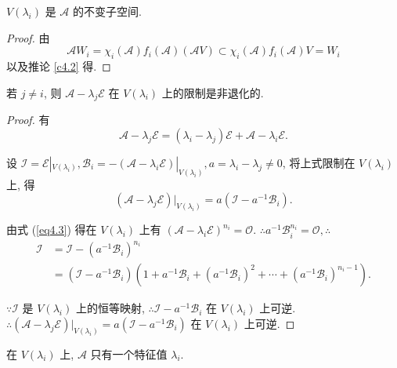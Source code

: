 \documentclass[color=black,device=normal,lang=cn,mode=geye]{elegantnote}
\begin{document}
\begin{corollary}
    $V(\lambda_i)$ 是 $\mathcal{A}$ 的不变子空间.
\end{corollary}
\begin{proof}
    由
    \[\mathcal{A}W_i=\chi_i(\mathcal{A})f_i(\mathcal{A})(\mathcal{A}V)\subset\chi_i(\mathcal{A})f_i(\mathcal{A})V=W_i\]
    以及推论 \ref{c4.2} 得.
\end{proof}
\begin{corollary}\label{c4.4}
    若 $j\neq i$, 则 $\mathcal{A}-\lambda_j\mathcal{E}$ 在 $V(\lambda_i)$ 上的限制是非退化的.
\end{corollary}
\begin{proof}
    有
    \[\mathcal{A}-\lambda_j\mathcal{E}=(\lambda_i-\lambda_j)\mathcal{E}+\mathcal{A}-\lambda_i\mathcal{E}.\]

    设 $\mathcal{I}=\mathcal{E}|_{V(\lambda_i)},\mathcal{B}_i=-(\mathcal{A}-\lambda_i\mathcal{E})|_{V(\lambda_i)},a=\lambda_i-\lambda_j\neq0$, 将上式限制在 $V(\lambda_i)$ 上, 得
    \[(\mathcal{A}-\lambda_j\mathcal{E})|_{V(\lambda_i)}=a(\mathcal{I}-a^{-1}\mathcal{B}_i).\]

    由式 (\ref{eq4.3}) 得在 $V(\lambda_i)$ 上有 $(\mathcal{A}-\lambda_i\mathcal{E})^{n_i}=\mathcal{O}$. $\therefore a^{-1}\mathcal{B}_i^{n_i}=\mathcal{O},\therefore$
    \begin{align*}
        \mathcal{I} & =\mathcal{I}-(a^{-1}\mathcal{B}_i)^{n_i} \\
        & =(\mathcal{I}-a^{-1}\mathcal{B}_i)(1+a^{-1}\mathcal{B}_i+(a^{-1}\mathcal{B}_i)^2+\cdots+(a^{-1}\mathcal{B}_i)^{n_i-1}).
    \end{align*}

    $\because\mathcal{I}$ 是 $V(\lambda_i)$ 上的恒等映射, $\therefore\mathcal{I}-a^{-1}\mathcal{B}_i$ 在 $V(\lambda_i)$ 上可逆. $\therefore(\mathcal{A}-\lambda_j\mathcal{E})|_{V(\lambda_i)}=a(\mathcal{I}-a^{-1}\mathcal{B}_i)$ 在 $V(\lambda_i)$ 上可逆.
\end{proof}
\begin{corollary}
    在 $V(\lambda_i)$ 上, $\mathcal{A}$ 只有一个特征值 $\lambda_i$.
\end{corollary}
\end{document}
